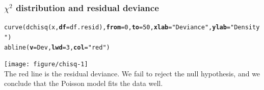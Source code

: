 \documentclass[color=usenames,dvipsnames]{beamer}\usepackage[]{graphicx}\usepackage[]{color}
\makeatletter
\newcommand{\hlnum}[1]{\textcolor[rgb]{0.69,0.494,0}{#1}}%
\newcommand{\hlstr}[1]{\textcolor[rgb]{0.749,0.012,0.012}{#1}}%
\newcommand{\hlstd}[1]{\textcolor[rgb]{0,0,0}{#1}}%
\newcommand{\hlkwc}[1]{\textcolor[rgb]{0,0,0}{\textbf{#1}}}%
\newcommand{\hlkwd}[1]{\textcolor[rgb]{0.004,0.004,0.506}{#1}}%
\newenvironment{kframe}{%
 \def\at@end@of@kframe{}%
 \ifinner\ifhmode%
  \def\at@end@of@kframe{\end{minipage}}%
  \begin{minipage}{\columnwidth}%
 \fi\fi%
 \def\FrameCommand##1{\hskip\@totalleftmargin \hskip-\fboxsep
 \colorbox{shadecolor}{##1}\hskip-\fboxsep
     \hskip-\linewidth \hskip-\@totalleftmargin \hskip\columnwidth}%
 \MakeFramed {\advance\hsize-\width
   \@totalleftmargin\z@ \linewidth\hsize
   \@setminipage}}%
 {\par\unskip\endMakeFramed%
 \at@end@of@kframe}
\newenvironment{knitrout}{}{} %
\makeatother
\begin{document}








\begin{frame}[fragile]
  \frametitle{$\chi^2$ distribution and residual deviance}
\begin{knitrout}\tiny
{}\color{fgcolor}\begin{kframe}
\begin{alltt}
\hlkwd{curve}\hlstd{(}\hlkwd{dchisq}\hlstd{(x,} \hlkwc{df}\hlstd{=df.resid),} \hlkwc{from}\hlstd{=}\hlnum{0}\hlstd{,} \hlkwc{to}\hlstd{=}\hlnum{50}\hlstd{,} \hlkwc{xlab}\hlstd{=}\hlstr{"Deviance"}\hlstd{,} \hlkwc{ylab}\hlstd{=}\hlstr{"Density"}\hlstd{)}
\hlkwd{abline}\hlstd{(}\hlkwc{v}\hlstd{=Dev,} \hlkwc{lwd}\hlstd{=}\hlnum{3}\hlstd{,} \hlkwc{col}\hlstd{=}\hlstr{"red"}\hlstd{)}
\end{alltt}
\end{kframe}
\end{knitrout}
{\centering
\texttt{[image: figure/chisq-1]} \\
}
The red line is the residual deviance. We fail to reject the null
hypothesis, and we conclude that the Poisson model fits the data
well.  \\
\end{frame}
\end{document}
